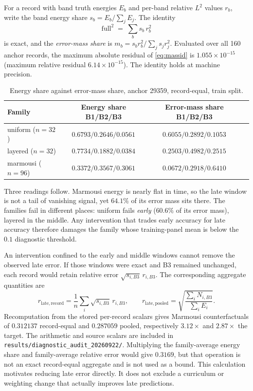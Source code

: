 \documentclass[11pt,a4paper]{article}
\begin{document}
For a record with band truth energies $E_b$ and per-band relative $L^2$ values $r_b$, write
the band energy share $s_b = E_b / \sum_j E_j$. The identity
\begin{equation}
\label{eq:massid}
\mathrm{full}^2 \;=\; \sum_b s_b\, r_b^2
\end{equation}
is exact, and the \emph{error-mass share} is $m_b = s_b r_b^2 / \sum_j s_j r_j^2$. Evaluated
over all 160 anchor records, the maximum absolute residual of \eqref{eq:massid} is
$1.055\times10^{-15}$ (maximum relative residual $6.14\times10^{-15}$). The identity holds at
machine precision.

\begin{table}[t]
\centering
\caption{Energy share against error-mass share, anchor 29359, record-equal, train split.}
\label{tab:mass}
\begin{tabular}{lccc}
\toprule
Family & Energy share B1/B2/B3 & Error-mass share B1/B2/B3 \\
\midrule
uniform ($n=32$)  & $0.6793 / 0.2646 / 0.0561$ & $\mathbf{0.6055} / 0.2892 / 0.1053$ \\
layered ($n=32$)  & $0.7734 / 0.1882 / 0.0384$ & $0.2503 / \mathbf{0.4982} / 0.2515$ \\
marmousi ($n=96$) & $0.3372 / 0.3567 / 0.3061$ & $0.0672 / 0.2918 / \mathbf{0.6410}$ \\
\bottomrule
\end{tabular}
\end{table}

Three readings follow. Marmousi energy is nearly flat in time, so the late window is not a
tail of vanishing signal, yet $64.1\%$ of its error mass sits there. The families fail in
different places: uniform fails \emph{early} ($60.6\%$ of its error mass), layered in the
middle. Any intervention that trades early accuracy for late accuracy therefore damages the
family whose training-panel mean is below the $0.1$ diagnostic threshold.

An intervention confined to the early and middle windows cannot remove the observed late
error. If those windows were exact and B3 remained unchanged, each record would retain
relative error $\sqrt{s_{i,B3}}\,r_{i,B3}$. The corresponding aggregate quantities are
\begin{equation}
 r_{\mathrm{late,record}} = \frac{1}{n}\sum_i \sqrt{s_{i,B3}}\,r_{i,B3},
 \qquad
 r_{\mathrm{late,pooled}} =
 \sqrt{\frac{\sum_i N_{i,B3}}{\sum_i E_i}}.
\end{equation}
Recomputation from the stored per-record scalars gives Marmousi counterfactuals of
$0.312137$ record-equal and $0.287059$ pooled, respectively $3.12\times$ and $2.87\times$ the target.
The arithmetic and source scalars are included in \texttt{results/diagnostic\_audit\_20260922/}.
Multiplying the family-average energy share and family-average relative error would give
$0.3169$, but that operation is not an exact record-equal aggregate and is not used as a bound.
This calculation motivates reducing late error directly. It does not exclude a curriculum
or weighting change that actually improves late predictions.
\end{document}
